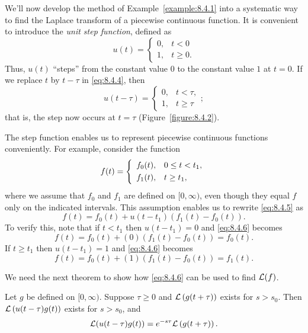 
\noindent
We'll now develop the method of Example~\ref{example:8.4.1} into a systematic way to find the
Laplace transform of a piecewise continuous function. It is convenient to introduce the
{\color{blue}\it unit step function\/}, defined as
\begin{equation}
  \label{eq:8.4.4}u(t)=\left\{
  \begin{array}{rl}
    0, & t<0    \\
    1, & t\ge0.
  \end{array}\right.
\end{equation}
Thus, $u(t)$ ``steps'' from the constant value $0$ to the constant value $1$ at $t=0$. If we replace
$t$ by $t-\tau$ in \eqref{eq:8.4.4}, then
\[
  u(t-\tau)=\left\{
  \begin{array}{rl}
    0, & t<\tau,  \\
    1, & t\ge\tau
  \end{array}\right.;
\]
that is, the step now occurs at $t=\tau$ (Figure~\ref{figure:8.4.2}).

The step function enables us to represent piecewise continuous functions conveniently. For example,
consider the function
\begin{equation}
  \label{eq:8.4.5}f(t)=\left\{
  \begin{array}{rl}
    f_{0}(t), & 0\le t<t_{1}, \\[1\jot]
    f_{1}(t), & t\ge t_{1},
  \end{array}\right.
\end{equation}
where we assume that $f_{0}$ and $f_{1}$ are defined on $[0,\infty)$, even though they equal $f$
only on the indicated intervals. This assumption enables us to rewrite \eqref{eq:8.4.5} as
\begin{equation}
  \label{eq:8.4.6}f(t)=f_{0}(t)+u(t-t_{1})\left(f_{1}(t)-f_{0}(t)\right).
\end{equation}
To verify this, note that if $t<t_{1}$ then $u(t-t_{1})=0$ and \eqref{eq:8.4.6} becomes
\[
  f(t)=f_{0}(t)+(0)\left(f_{1}(t)-f_{0}(t)\right)=f_{0}(t).
\]
If $t\ge t_{1}$ then $u(t-t_{1})=1$ and \eqref{eq:8.4.6} becomes
\[
  f(t)=f_{0}(t)+(1)\left(f_{1}(t)-f_{0}(t)\right)=f_{1}(t).
\]

We need the next theorem to show how \eqref{eq:8.4.6} can be used to find ${\cal L}(f)$.

\begin{theorem}
  \color{blue}
  \label{thmtype:8.4.1} Let $g$ be defined on $[0,\infty)$. Suppose $\tau\ge0$ and
  ${\cal L}\left(g(t+\tau)\right)$ exists for $s>s_{0}$. Then ${\cal L}\left(u(t-\tau)g(t)\right)$
  exists for $s>s_{0}$, and
  \[
    {\cal L}(u(t-\tau)g(t))=e^{-s\tau}{\cal L}\left(g(t+\tau)\right).
  \]
\end{theorem}

